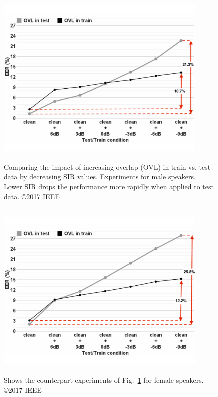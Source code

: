 \begin{figure}[h!]
	\includegraphics[height = 3.43in, width=0.9\textwidth]{figures/sidingrid_ovlintrainvstest_male_rev1}
	\caption{ Comparing the impact of increasing overlap (OVL) in train vs. test data by decreasing SIR values. Experiments for male speakers. Lower SIR drops the performance more rapidly when applied to test data. \copyright 2017 IEEE}
	\label{fig:ch3_sidingrid_ovlintrainvstest_male}
\end{figure}

\begin{figure}[h!]
	\includegraphics[height = 3.43in, width=0.9\textwidth]{figures/sidingrid_ovlintrainvstest_female_rev1}
	\caption{ Shows the counterpart experiments of Fig.~\ref{fig:ch3_sidingrid_ovlintrainvstest_male} for female speakers. \copyright 2017 IEEE}
	\label{fig:ch3_sidingrid_ovlintrainvstest_female}
\end{figure}


